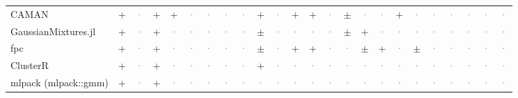 \documentclass[10pt,a4paper]{article}
\begin{document}
\begin{landscape}
{\begin{longtable}{@{}l *{23}{c}@{}}
CAMAN & \cellcolor{yes!35}+ & \textcolor{gray}{·} & \cellcolor{yes!35}+ & \cellcolor{yes!35}+ & \textcolor{gray}{·} & \textcolor{gray}{·} & \textcolor{gray}{·} & \textcolor{gray}{·} & \cellcolor{yes!35}+ & \textcolor{gray}{·} & \cellcolor{yes!35}+ & \cellcolor{yes!35}+ & \textcolor{gray}{·} & \cellcolor{part!45}$\pm$ & \textcolor{gray}{·} & \textcolor{gray}{·} & \cellcolor{yes!35}+ & \textcolor{gray}{·} & \textcolor{gray}{·} & \textcolor{gray}{·} & \textcolor{gray}{·} & \textcolor{gray}{·} & \textcolor{gray}{·} \\
GaussianMixtures.jl & \cellcolor{yes!35}+ & \textcolor{gray}{·} & \cellcolor{yes!35}+ & \textcolor{gray}{·} & \textcolor{gray}{·} & \textcolor{gray}{·} & \textcolor{gray}{·} & \textcolor{gray}{·} & \cellcolor{part!45}$\pm$ & \textcolor{gray}{·} & \textcolor{gray}{·} & \textcolor{gray}{·} & \textcolor{gray}{·} & \cellcolor{part!45}$\pm$ & \cellcolor{yes!35}+ & \textcolor{gray}{·} & \textcolor{gray}{·} & \textcolor{gray}{·} & \textcolor{gray}{·} & \textcolor{gray}{·} & \textcolor{gray}{·} & \textcolor{gray}{·} & \textcolor{gray}{·} \\
fpc & \cellcolor{yes!35}+ & \textcolor{gray}{·} & \cellcolor{yes!35}+ & \textcolor{gray}{·} & \textcolor{gray}{·} & \textcolor{gray}{·} & \textcolor{gray}{·} & \textcolor{gray}{·} & \cellcolor{part!45}$\pm$ & \textcolor{gray}{·} & \cellcolor{yes!35}+ & \cellcolor{yes!35}+ & \textcolor{gray}{·} & \textcolor{gray}{·} & \cellcolor{part!45}$\pm$ & \cellcolor{yes!35}+ & \textcolor{gray}{·} & \cellcolor{part!45}$\pm$ & \textcolor{gray}{·} & \textcolor{gray}{·} & \textcolor{gray}{·} & \textcolor{gray}{·} & \textcolor{gray}{·} \\
ClusterR & \cellcolor{yes!35}+ & \textcolor{gray}{·} & \cellcolor{yes!35}+ & \textcolor{gray}{·} & \textcolor{gray}{·} & \textcolor{gray}{·} & \textcolor{gray}{·} & \textcolor{gray}{·} & \cellcolor{yes!35}+ & \textcolor{gray}{·} & \textcolor{gray}{·} & \textcolor{gray}{·} & \textcolor{gray}{·} & \textcolor{gray}{·} & \textcolor{gray}{·} & \textcolor{gray}{·} & \textcolor{gray}{·} & \textcolor{gray}{·} & \textcolor{gray}{·} & \textcolor{gray}{·} & \textcolor{gray}{·} & \textcolor{gray}{·} & \textcolor{gray}{·} \\
mlpack (mlpack::gmm) & \cellcolor{yes!35}+ & \textcolor{gray}{·} & \cellcolor{yes!35}+ & \textcolor{gray}{·} & \textcolor{gray}{·} & \textcolor{gray}{·} & \textcolor{gray}{·} & \textcolor{gray}{·} & \textcolor{gray}{·} & \textcolor{gray}{·} & \textcolor{gray}{·} & \textcolor{gray}{·} & \textcolor{gray}{·} & \textcolor{gray}{·} & \textcolor{gray}{·} & \textcolor{gray}{·} & \textcolor{gray}{·} & \textcolor{gray}{·} & \textcolor{gray}{·} & \textcolor{gray}{·} & \textcolor{gray}{·} & \textcolor{gray}{·} & \textcolor{gray}{·} \\

\end{longtable}}
\end{landscape}
\end{document}
